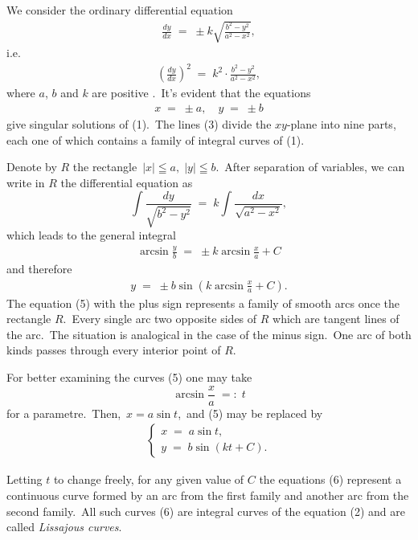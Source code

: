 \documentclass[12pt]{article}
\theoremstyle{definition}
\begin{document}
We consider the  ordinary differential equation
\begin{align}
\frac{dy}{dx} \;=\; \pm k\sqrt{\frac{b^2\!-\!y^2}{a^2\!-\!x^2}},
\end{align}
i.e.
\begin{align}
\left(\frac{dy}{dx}\right)^2 \;=\; k^2\!\cdot\!\frac{b^2\!-\!y^2}{a^2\!-\!x^2},
\end{align}
where $a$, $b$ and $k$ are positive .\, It's evident that the equations
\begin{align}
x \;=\; \pm a, \quad y \;=\; \pm b
\end{align}
give singular solutions of (1).\, The lines (3) divide the $xy$-plane into nine parts, each one of which contains a family of  integral curves of (1). 

Denote by $R$ the rectangle \,$|x| \leqq a,\; |y| \leqq b$.\, After separation of variables, we can write in $R$ the differential equation as
$$\int\!\frac{dy}{\sqrt{b^2\!-\!y^2}} \;=\; k\!\int\!\frac{dx}{\sqrt{a^2\!-\!x^2}},$$
which leads to the general integral
\begin{align}
\arcsin\frac{y}{b} \;=\; \pm k\arcsin\frac{x}{a}+C
\end{align}
and therefore
\begin{align}
y \;=\; \pm b\sin\left(k\arcsin\frac{x}{a}+C\right).
\end{align}
The equation (5) with the plus sign represents a family of smooth arcs  once the rectangle $R$.\, Every single arc  two opposite sides of $R$ which are tangent lines of the arc.\, The situation is analogical in the case of the minus sign.\, One arc of both kinds passes through every interior point of $R$.

For better examining the curves (5) one may take 
$$\arcsin\frac{x}{a} \;=:\; t$$
for a parametre.\, Then,\, $x = a\sin{t}$,\, and (5) may be replaced by
\begin{align}
\begin{cases}
x \;=\; a\sin{t},\\
y \;=\; b\sin(kt\!+\!C).
\end{cases}
\end{align}

Letting $t$ to change freely, for any given value of $C$ the equations (6) represent a continuous curve formed by an arc from the first family and another arc from the second family.\, All such curves (6) are integral curves of the equation (2) and are called \emph{Lissajous curves}.   \\
\end{document}

